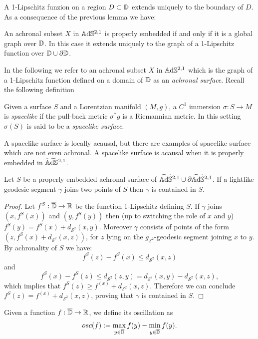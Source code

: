 A 1-Lipschitz funzion on a region $D \subset \mathbb{D}$ extends uniquely to the boundary of $D$. As a consequence of the previous lemma we have:
\begin{lemma}\label{lem:global 1-lip}
    An achronal subset $X$ in $\mathbb{A}\mathrm{d}\mathbb{S}^{2,1}$ is properly embedded if and only if it is a global graph over $\mathbb{D}$. In this case it extends uniquely to the graph of a 1-Lipschitz function over $\mathbb{D} \cup \partial \mathbb{D}$.
\end{lemma}
In the following we refer to an achronal subset $X$ in $\mathbb{A}\mathrm{d}\mathbb{S}^{2,1}$ which is the graph of a 1-Lipschitz function defined on a domain of $\mathbb{D}$ as an \textit{achronal surface}. Recall the following definition
\begin{definition}
    Given a surface $S$ and a Lorentzian manifold $(M,g)$, a $C^1$ immersion $\sigma : S \to M$ is \textit{spacelike} if the pull-back metric $\sigma^* g$ is a Riemannian metric. In this setting $\sigma(S)$ is said to be a \textit{spacelike surface}.
\end{definition}
A spacelike surface is locally acausal, but there are examples of spacelike surface which are not even achronal. A spacelike surface is acausal when it is properly embedded in $\widetilde{\mathbb{A}\mathrm{d}\mathbb{S}}{}^{2,1}$. 
\begin{lemma}\label{lem:lightlike}
    Let $S$ be a properly embedded achronal surface of $\widetilde{\mathbb{A}\mathrm{d}\mathbb{S}}{}^{2,1} \cup \partial\widetilde{\mathbb{A}\mathrm{d}\mathbb{S}}{}^{2,1}$. If a lightlike geodesic segment $\gamma$ joins two points of $S$ then $\gamma$ is contained in $S$.
\end{lemma}
\begin{proof}
    Let $f^S:\overline{\mathbb{D}} \to \mathbb{R}$ be the function 1-Lipschitz defining $S$. If $\gamma$ joins $(x,f^S(x))$ and $(y,f^S(y))$ then (up to switching the role of $x$ and $y$) $f^S(y) = f^S(x) + d_{\mathcal{S}^2}(x,y)$. Moreover $\gamma$ consists of points of the form $(z,f^S(x) + d_{\mathcal{S}^2}(x,z))$, for $z$ lying on the $g_{\mathcal{S}^2}$-geodesic segment joining $x$ to $y$. By achronality of $S$ we have:
    \[
        f^S(z) - f^S(x) \leq d_{\mathcal{S}^2}(x,z)
    \]
    and 
    \[
        f^S(x) - f^S(z) \leq d_{\mathcal{S}^2}(z,y) = d_{\mathcal{S}^2}(x,y) - d_{\mathcal{S}^2}(x,z),
    \]
    which implies that $f^S(z) \geq f^(x) + d_{\mathcal{S}^2}(x,z)$. Therefore we can conclude $f^S(z) = f^(x) + d_{\mathcal{S}^2}(x,z)$, proving that $\gamma$ is contained in $S$.
\end{proof}
Given a function $f: \overline{\mathbb{D}}\to\mathbb{R}$, we define its oscillation as 
\[
    osc(f):= \max_{y\in\overline{\mathbb{D}}} f(y) - \min_{y\in\overline{\mathbb{D}}} f(y).
\]
